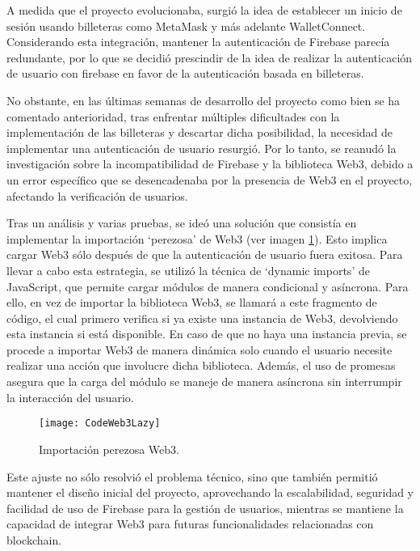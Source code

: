 A medida que el proyecto evolucionaba, surgió la idea de establecer un inicio de sesión usando billeteras como MetaMask y más adelante WalletConnect. Considerando esta integración, mantener la autenticación de Firebase parecía redundante, por lo que se decidió prescindir de la idea de realizar la autenticación de usuario con firebase en favor de la autenticación basada en billeteras.
 
No obstante, en las últimas semanas de desarrollo del proyecto como bien se ha comentado anterioridad, tras enfrentar múltiples dificultades con la implementación de las billeteras y descartar dicha posibilidad, la necesidad de implementar una autenticación de usuario resurgió.
Por lo tanto, se reanudó la investigación sobre la incompatibilidad de Firebase y la biblioteca Web3, debido a un error específico que se desencadenaba por la presencia de Web3 en el proyecto, afectando la verificación de usuarios.

Tras un análisis y varias pruebas, se ideó una solución que consistía en implementar la importación `perezosa' de Web3 (ver imagen \ref{img:CodeWeb3Lazy}). Esto implica cargar Web3 sólo después de que la autenticación de usuario fuera exitosa. Para llevar a cabo esta estrategia, se utilizó la técnica de `dynamic imports' de JavaScript, que permite cargar módulos de manera condicional y asíncrona. 
Para ello, en vez de importar la biblioteca Web3, se llamará a este fragmento de código, el cual primero verifica si ya existe una instancia de Web3, devolviendo esta instancia si está disponible. En caso de que no haya una instancia previa, se procede a importar Web3 de manera dinámica solo cuando el usuario necesite realizar una acción que involucre dicha biblioteca.
Además, el uso de promesas asegura que la carga del módulo se maneje de manera asíncrona  sin interrumpir la interacción del usuario.

\begin{figure}[h]
	\label{img:CodeWeb3Lazy}
	\centering
	\texttt{[image: CodeWeb3Lazy]}
	\caption[Importación perezosa Web3]{Importación perezosa Web3.}
\end{figure}

Este ajuste no sólo resolvió el problema técnico, sino que también permitió mantener el diseño inicial del proyecto, aprovechando la escalabilidad, seguridad y facilidad de uso de Firebase para la gestión de usuarios, mientras se mantiene la capacidad de integrar Web3 para futuras funcionalidades relacionadas con blockchain.